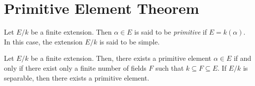 \section*{Primitive Element Theorem}

\begin{definition}
    Let $E/k$ be a finite extension. Then $\alpha\in E$ is said to be \textit{primitive} if $E = k(\alpha)$. In this case, the extension $E/k$ is said to be simple.
\end{definition}

\begin{theorem}[Steinitz, 1910]
    Let $E/k$ be a finite extension. Then, there exists a primitive element $\alpha\in E$ if and only if there exist only a finite number of fields $F$ such that $k\subseteq F\subseteq E$. If $E/k$ is separable, then there exists a primitive element.
\end{theorem}
